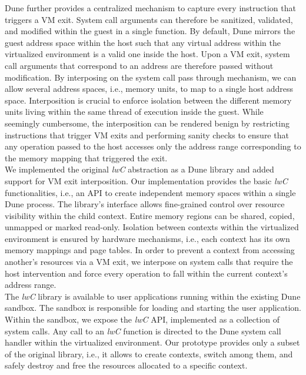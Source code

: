 \documentclass[letterpaper,twocolumn,10pt]{article}
\begin{document}
Dune further provides a centralized mechanism to capture every instruction that triggers a VM exit.
System call arguments can therefore be sanitized, validated, and modified within the guest in a single function.
By default, Dune mirrors the guest address space within the host such that any virtual address within the virtualized environment is a valid one inside the host.
Upon a VM exit, system call arguments that correspond to an address are therefore passed without modification.
By interposing on the system call pass through mechanism, we can allow several address spaces, i.e., memory units, to map to a single host address space.
Interposition is crucial to enforce isolation between the different memory units living within the same thread of execution inside the guest.
While seemingly cumbersome, the interposition can be rendered benign by restricting instructions that trigger VM exits and performing sanity checks to ensure that any operation passed to the host accesses only the address range corresponding to the memory mapping that triggered the exit.\\

We implemented the original \emph{lwC} abstraction as a Dune library and added support for VM exit interposition.
Our implementation provides the basic \emph{lwC} functionalities, i.e., an API to create independent memory spaces within a single Dune process.
The library's interface allows fine-grained control over resource visibility within the child context.
Entire memory regions can be shared, copied, unmapped or marked read-only.
Isolation between contexts within the virtualized environment is ensured by hardware mechanisms, i.e., each context has its own memory mappings and page tables.
In order to prevent a context from accessing another's resources via a VM exit, we interpose on system calls that require the host intervention and force every operation to fall within the current context's address range.\\

The \emph{lwC} library is available to user applications running within the existing Dune sandbox.
The sandbox is responsible for loading and starting the user application.
Within the sandbox, we expose the \emph{lwC} API, implemented as a collection of system calls.
Any call to an \emph{lwC} function is directed to the Dune system call handler within the virtualized environment.
Our prototype provides only a subset of the original library, i.e., it allows to create contexts, switch among them, and safely destroy and free the resources allocated to a specific context.
\end{document}
